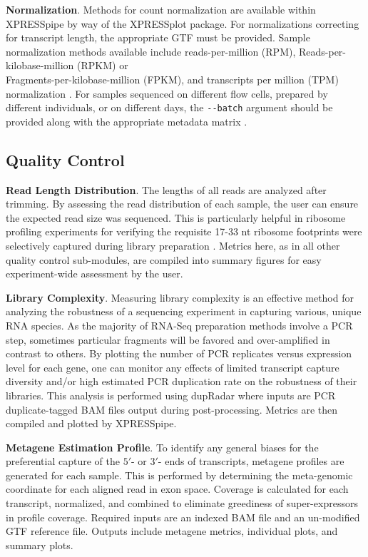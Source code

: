 \documentclass[10pt, oneside]{article}
\begin{document}
\noindent\textbf{Normalization}. Methods for count normalization are available within XPRESSpipe by way of the XPRESSplot package. For normalizations correcting for transcript length, the appropriate GTF must be provided. Sample normalization methods available include reads-per-million (RPM), Reads-per-kilobase-million (RPKM) or \\Fragments-per-kilobase-million (FPKM), and transcripts per million (TPM) normalization \cite{evans_briefbio}. For samples sequenced on different flow cells, prepared by different individuals, or on different days, the \texttt{-{}-batch} argument should be provided along with the appropriate metadata matrix \cite{sva}.\\

\subsection*{Quality Control}
\textbf{Read Length Distribution}. The lengths of all reads are analyzed after trimming. By assessing the read distribution of each sample, the user can ensure the expected read size was sequenced. This is particularly helpful in ribosome profiling experiments for verifying the requisite 17-33 nt ribosome footprints were selectively captured during library preparation \cite{ingolia_meth, fp_range}. Metrics here, as in all other quality control sub-modules, are compiled into summary figures for easy experiment-wide assessment by the user. \par

\noindent\textbf{Library Complexity}. Measuring library complexity is an effective method for analyzing the robustness of a sequencing experiment in capturing various, unique RNA species. As the majority of RNA-Seq preparation methods involve a PCR step, sometimes particular fragments will be favored and over-amplified in contrast to others. By plotting the number of PCR replicates versus expression level for each gene, one can monitor any effects of limited transcript capture diversity and/or high estimated PCR duplication rate on the robustness of their libraries. This analysis is performed using dupRadar \cite{dupradar} where inputs are PCR duplicate-tagged BAM files output during post-processing. Metrics are then compiled and plotted by XPRESSpipe.\par

\noindent\textbf{Metagene Estimation Profile}. To identify any general biases for the preferential capture of the $5'$- or $3'$- ends of transcripts, metagene profiles are generated for each sample. This is performed by determining the meta-genomic coordinate for each aligned read in exon space. Coverage is calculated for each transcript, normalized, and combined to eliminate greediness of super-expressors in profile coverage. Required inputs are an indexed BAM file and an un-modified GTF reference file. Outputs include metagene metrics, individual plots, and summary plots.\par
\end{document}

